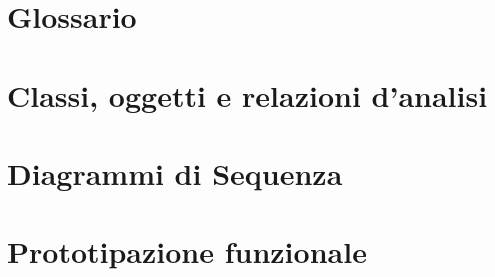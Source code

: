\raggedright{\section{Glossario}}

\raggedright{\section{Classi, oggetti e relazioni d'analisi}}

\raggedright{\section{Diagrammi di Sequenza}}

\raggedright{\section{Prototipazione funzionale}}









